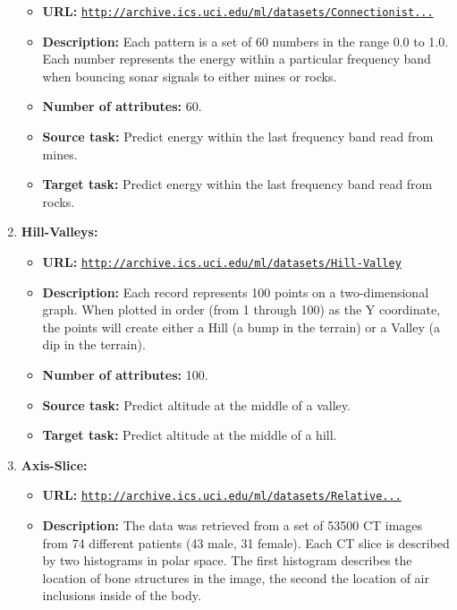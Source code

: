 \documentclass{article}
\begin{document}
\begin{enumerate}
\begin{itemize}
      \item \textbf{URL:} \href{http://archive.ics.uci.edu/ml/datasets/Connectionist+Bench+(Sonar,+Mines+vs.+Rocks)}{\texttt{http://archive.ics.uci.edu/ml/datasets/Connectionist...}}
      \item \textbf{Description:} Each pattern is a set of 60 numbers in the range 0.0 to 1.0. Each number represents the energy within a particular frequency band when bouncing sonar signals to either mines or rocks.
      \item \textbf{Number of attributes:} 60.
      \item \textbf{Source task:} Predict energy within the last frequency band read from mines.
      \item \textbf{Target task:} Predict energy within the last frequency band read from rocks.
    \end{itemize}
  \item \textbf{Hill-Valleys:} 
    \begin{itemize}
      \item \textbf{URL:} \href{http://archive.ics.uci.edu/ml/datasets/Hill-Valley}{\texttt{http://archive.ics.uci.edu/ml/datasets/Hill-Valley}}
      \item \textbf{Description:} Each record represents 100 points on a two-dimensional graph. When plotted in order (from 1 through 100) as the Y coordinate, the points will create either a Hill (a bump in the terrain) or a Valley (a dip in the terrain). 
      \item \textbf{Number of attributes:} 100.
      \item \textbf{Source task:} Predict altitude at the middle of a valley.
      \item \textbf{Target task:} Predict altitude at the middle of a hill.
    \end{itemize}
  \item \textbf{Axis-Slice:} 
    \begin{itemize}
      \item \textbf{URL:} \href{http://archive.ics.uci.edu/ml/datasets/Relative+location+of+CT+slices+on+axial+axis}{\texttt{http://archive.ics.uci.edu/ml/datasets/Relative...}}
      \item \textbf{Description:} The data was retrieved from a set of 53500 CT images from 74 different 
      patients (43 male, 31 female). Each CT slice is described by two histograms in polar space. 
      The first histogram describes the location of bone structures in the image, the second the location of air inclusions inside of the body.

\end{itemize}
\end{enumerate}
\end{document}
